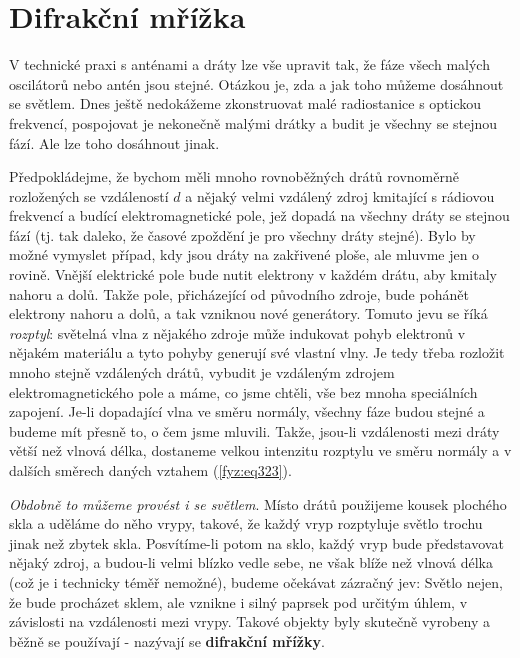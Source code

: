   \section{Difrakční mřížka}\label{fyz:IchapXXXsecII}
    V technické praxi s anténami a dráty lze vše upravit tak, že fáze všech malých oscilátorů nebo 
    antén jsou stejné. Otázkou je, zda a jak toho můžeme dosáhnout se světlem. Dnes ještě 
    nedokážeme zkonstruovat malé radiostanice s optickou frekvencí, pospojovat je nekonečně malými 
    drátky a budit je všechny se stejnou fází. Ale lze toho dosáhnout jinak.
    
    Předpokládejme, že bychom měli mnoho rovnoběžných drátů rovnoměrně rozložených se vzdáleností 
    \(d\) a nějaký velmi vzdálený zdroj kmitající s rádiovou frekvencí a budící elektromagnetické 
    pole, jež dopadá na všechny dráty se stejnou fází (tj. tak daleko, že časové zpoždění je pro 
    všechny dráty stejné). Bylo by možné vymyslet případ, kdy jsou dráty na zakřivené ploše, ale 
    mluvme jen o rovině. Vnější elektrické pole bude nutit elektrony v každém drátu, aby kmitaly 
    nahoru a dolů. Takže pole, přicházející od původního zdroje, bude pohánět elektrony nahoru a 
    dolů, a tak vzniknou nové generátory. Tomuto jevu se říká \emph{rozptyl}: světelná vlna z 
    nějakého zdroje může indukovat pohyb elektronů v nějakém materiálu a tyto pohyby generují své 
    vlastní vlny. Je tedy třeba rozložit mnoho stejně vzdálených drátů, vybudit je vzdáleným 
    zdrojem elektromagnetického pole a máme, co jsme chtěli, vše bez mnoha speciálních zapojení. 
    Je-li dopadající vlna ve směru normály, všechny fáze budou stejné a budeme mít přesně to, o čem 
    jsme mluvili. Takže, jsou-li vzdálenosti mezi dráty větší než vlnová délka, dostaneme velkou 
    intenzitu rozptylu ve směru normály a v dalších směrech daných vztahem (\ref{fyz:eq323}).
    
    \emph{Obdobně to můžeme provést i se světlem}. Místo drátů použijeme kousek plochého skla a 
    uděláme do něho vrypy, takové, že každý vryp rozptyluje světlo trochu jinak než zbytek skla. 
    Posvítíme-li potom na sklo, každý vryp bude představovat nějaký zdroj, a budou-li velmi blízko 
    vedle sebe, ne však blíže než vlnová délka (což je i technicky téměř nemožné), budeme očekávat 
    zázračný jev: Světlo nejen, že bude procházet sklem, ale vznikne i silný paprsek pod určitým 
    úhlem, v závislosti na vzdálenosti mezi vrypy. Takové objekty byly skutečně vyrobeny a běžně se 
    používají - nazývají se \textbf{difrakční mřížky}.
    
